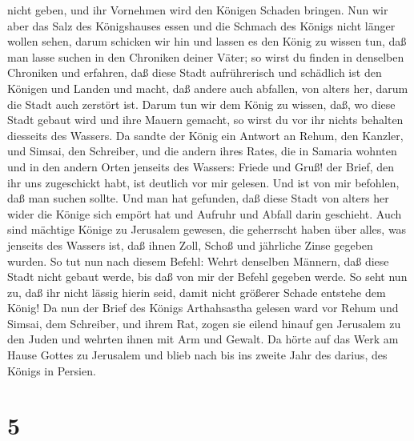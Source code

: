 nicht geben, und ihr Vornehmen wird den Königen Schaden bringen.
 Nun wir aber das Salz des Königshauses essen und die
Schmach des Königs nicht länger wollen sehen, darum schicken wir hin und
lassen es den König zu wissen tun,  daß man lasse suchen in
den Chroniken deiner Väter; so wirst du finden in denselben Chroniken
und erfahren, daß diese Stadt aufrührerisch und schädlich ist den
Königen und Landen und macht, daß andere auch abfallen, von alters her,
darum die Stadt auch zerstört ist.  Darum tun wir dem König
zu wissen, daß, wo diese Stadt gebaut wird und ihre Mauern gemacht, so
wirst du vor ihr nichts behalten diesseits des Wassers.  Da
sandte der König ein Antwort an Rehum, den Kanzler, und Simsai, den
Schreiber, und die andern ihres Rates, die in Samaria wohnten und in den
andern Orten jenseits des Wassers: Friede und Gruß!  der
Brief, den ihr uns zugeschickt habt, ist deutlich vor mir gelesen.
 Und ist von mir befohlen, daß man suchen sollte. Und man
hat gefunden, daß diese Stadt von alters her wider die Könige sich
empört hat und Aufruhr und Abfall darin geschieht.  Auch
sind mächtige Könige zu Jerusalem gewesen, die geherrscht haben über
alles, was jenseits des Wassers ist, daß ihnen Zoll, Schoß und jährliche
Zinse gegeben wurden.  So tut nun nach diesem Befehl: Wehrt
denselben Männern, daß diese Stadt nicht gebaut werde, bis daß von mir
der Befehl gegeben werde.  So seht nun zu, daß ihr nicht
lässig hierin seid, damit nicht größerer Schade entstehe dem König!
 Da nun der Brief des Königs Arthahsastha gelesen ward vor
Rehum und Simsai, dem Schreiber, und ihrem Rat, zogen sie eilend hinauf
gen Jerusalem zu den Juden und wehrten ihnen mit Arm und Gewalt.
 Da hörte auf das Werk am Hause Gottes zu Jerusalem und
blieb nach bis ins zweite Jahr des darius, des Königs in Persien.

\hypertarget{section-4}{%
\section{5}\label{section-4}}


